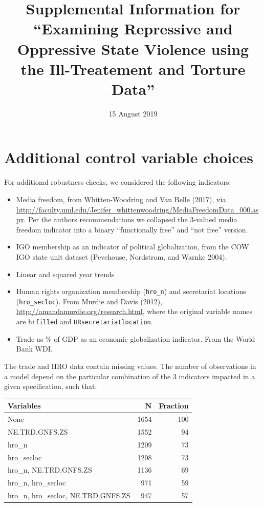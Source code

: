 \documentclass[]{article}
\title{Supplemental Information for ``Examining Repressive and Oppressive State
Violence using the Ill-Treatement and Torture Data''}
\author{}
\date{15 August 2019}
\providecommand{\tightlist}{%
  \setlength{\itemsep}{0pt}\setlength{\parskip}{0pt}}
\begin{document}
\maketitle

{
\setcounter{tocdepth}{2}
\tableofcontents
}
\hypertarget{additional-control-variable-choices}{%
\section{Additional control variable
choices}\label{additional-control-variable-choices}}

For additional robustness checks, we considered the following
indicators:

\begin{itemize}
\tightlist
\item
  Media freedom, from Whitten-Woodring and Van Belle (2017), via
  \url{http://faculty.uml.edu/Jenifer_whittenwoodring/MediaFreedomData_000.aspx}.
  Per the authors recommendations we collapsed the 3-valued media
  freedom indicator into a binary ``functionally free'' and ``not free''
  version.
\item
  IGO membership as an indicator of political globalization, from the
  COW IGO state unit dataset (Pevehouse, Nordstrom, and Warnke 2004).
\item
  Linear and squared year trends
\item
  Human rights organization membership (\texttt{hro\_n}) and secretariat
  locations (\texttt{hro\_secloc}). From Murdie and Davis (2012),
  \url{http://amandamurdie.org/research.html}, where the original
  variable names are \texttt{hrfilled} and
  \texttt{HRsecretariatlocation}.
\item
  Trade as \% of GDP as an economic globalization indicator. From the
  World Bank WDI.
\end{itemize}

The trade and HRO data contain missing values. The number of
observations in a model depend on the particular combination of the 3
indicators impacted in a given specification, such that:

\begin{table}[H]
\centering
\begin{tabular}{lrr}
\toprule
Variables & N & Fraction\\
\midrule
None & 1654 & 100\\
NE.TRD.GNFS.ZS & 1552 & 94\\
hro\_n & 1209 & 73\\
hro\_secloc & 1208 & 73\\
hro\_n, NE.TRD.GNFS.ZS & 1136 & 69\\
\addlinespace
hro\_n, hro\_secloc & 971 & 59\\
hro\_n, hro\_secloc, NE.TRD.GNFS.ZS & 947 & 57\\
\bottomrule
\end{tabular}
\end{table}
\end{document}
